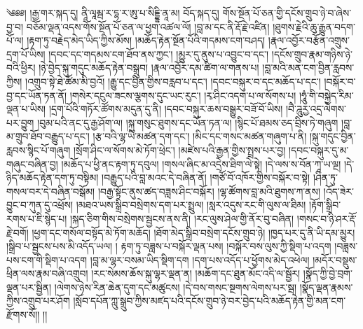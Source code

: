 \setcounter{footnote}{0} 
༄༅༅། །རྒྱ་གར་སྐད་དུ། ནཱི་ལཱམྦ་ར་དྷ་ར་ཨུ་པ་སིདྡྷི་ནཱ་མ། བོད་སྐད་དུ། གོས་སྔོན་པོ་ཅན་གྱི་དངོས་གྲུབ་ཉེ་བ་ཞེས་བྱ་བ། བཅོམ་ལྡན་འདས་གོས་སྔོན་པོ་ཅན་ལ་ཕྱག་འཚལ་ལོ། །བླ་མ་དང་ནི་རྡོ་རྗེ་འཛིན། །ཐུགས་རྗེའི་ཆུ་རྒྱུན་བདག་པོ་ལ། །རྟག་ཏུ་བརྗེད་མེད་ཡིད་ཀྱིས་མོས། །མཆོད་རྟེན་སྔོན་པོའི་གདམས་ངག་བཤད། །རྣལ་འབྱོར་བརྩོན་འགྲུས་དྲག་པོ་ཡིས། །དབང་དང་གདམས་ངག་ཐོབ་ནས་ཀྱང་། །མྱུར་དུ་ནུས་པ་འབྱུང་བ་དང་། །དངོས་གྲུབ་རྣམ་གཉིས་ཉེ་བའི་ཕྱིར། །ཉེ་བྱེད་སྐུ་གདུང་མཆོད་རྟེན་བསྒྲུབ། །རྣལ་འབྱོར་དམ་ཚིག་ལ་གནས་པ། །བླ་མའི་མན་ངག་བྱིན་རླབས་ཀྱིས། །འགྲུབ་སྟེ་ཐེ་ཚོམ་མི་བྱའོ། །རྒྱུ་དང་བྱིན་གྱིས་བརླབ་པ་དང་། །དབང་བསྐུར་བ་དང་མཆོད་པ་དང་། །བསྐོར་བ་བྱ་དང་ཡོན་ཏན་ནོ། །གསེར་དངུལ་ཟངས་ལྕགས་དུང་ཡང་རུང་། །རྭ་ཤིང་འདག་པ་ལ་སོགས་པ། །ཧཱུཾ་གི་བསྐྱེད་རིམ་ལྡན་པ་ཡིས། །དྲག་པོའི་གཏོར་ཚོགས་མདུན་དུ་ནི། །དབང་བསྐུར་ཆས་བསྒྱུར་བཟོ་བོ་ཡིས། །བཻ་ཌཱུརྱ་འདྲ་ལེགས་པར་བྱུག །བུམ་པའི་ནང་དུ་རྒྱ་ཤོག་ལ། །སྐུ་གསུང་ཐུགས་དང་ཡོན་ཏན་ལ། །སྙིང་པོ་ཐམས་ཅད་བྲིས་ཏེ་གཞུག །བླ་མ་གྲུབ་ཐོབ་བརྒྱུད་པ་དང་། །རྩ་བའི་ལྷ་ཡི་མཚན་དག་དང་། །མིང་དང་གསང་མཚན་གཞུག་པ་ནི། །སྐུ་གདུང་བྱིན་རླབས་སྙིང་པོ་གཞུག །སྲོག་ཤིང་ལ་སོགས་མེ་ཏོག་ཕྲེང་། །མཛེས་པའི་རྒྱན་གྱིས་སྤྲས་པར་བྱ། །དབང་བསྐུར་དུ་མ་གཞུང་བཞིན་བྱ། །མཆོད་པ་ཕྱི་ནང་རྟག་ཏུ་དབུལ། །གསལ་ཞིང་མ་འདྲེས་ཐིག་ལེ་སྟེ། །དེ་ལས་ས་བོན་ཀཱ་ཡ་ལྔ། །དེ་ཉིད་མཆོད་རྟེན་དག་ཏུ་བསྟིམ། །བརྒྱུད་པའི་བླ་མའང་དེ་བཞིན་ནོ། །གཙོ་བོ་འཁོར་གྱིས་བསྐོར་བ་སྟེ། །ཤིན་ཏུ་གསལ་བར་དེ་བཞིན་བསྒོམ། །བརྒྱ་སྟོང་ནུས་ཚད་བཟླས་ཤིང་བསྐོར། །ལྷ་ཚོགས་བླ་མའི་ཐུགས་ཀ་ནས། །འོད་ཟེར་བྱུང་བ་ཀུན་དུ་འཕྲོས། །མཐའ་ཡས་སྒྲིབ་བསྲེགས་དག་པར་སྤྲུལ། །སླར་འདུས་རང་གི་ལུས་ལ་ཐིམ། །རྟོག་སྒྲིབ་རགས་པ་ཇི་སྙེད་པ། །སྐད་ཅིག་གིས་བསྲེགས་སྦྱངས་ནས་ནི། །རང་ལུས་ཤེལ་གྱི་ནོར་བུ་བཞིན། །གསང་བ་ཉི་ཤར་རྡོ་རྗེ་བགོ། །ཕྱག་དང་གསོལ་བསྟོད་མེ་ཏོག་མཆོད། །ཐོག་མེད་སྒྲིབ་བསྲེག་དངོས་གྲུབ་ཉེ། །ཁྱད་པར་དུ་ནི་ཡི་དམ་མྱུར། །སྒྲིབ་པ་སྦྱངས་པས་མི་འདོད་ཡལ། །
རྟག་ཏུ་བཟླས་པ་བསྐོར་ལྡན་པས། །བསྐོར་བས་ལུས་ཀྱི་སྡིག་པ་འདག །བཟླས་པས་ངག་གི་སྡིག་པ་འདག །བླ་མ་ལྷར་བསམ་ཡིད་སྡིག་དག །དག་པས་འདོད་པ་ཕྱོགས་མེད་འཕེལ། །མདོར་བསྡུས་ཕྲིན་ལས་རྣམ་བཞི་འགྲུབ། །རང་སེམས་ཆོས་སྐུ་ལྷར་ལྡན་ན། །མཆོག་དང་ཐུན་མོང་འདི་ལ་སྦྱོར། །སྣོད་ཀྱི་བྱེ་བྲག་ལྡན་པར་སྦྱིན། །ལེགས་ཉེས་རིན་ཆེན་དུག་དང་མཚུངས། །དེ་བས་གསང་སྔགས་ལེགས་པར་སྦ། །སྣོད་ལྡན་རྣམས་ཀྱིས་འགྲུབ་པར་ཤོག །སློབ་དཔོན་ཀླུ་སྒྲུབ་ཀྱིས་མཛད་པའི་དངོས་གྲུབ་ཉེ་བར་བྱེད་པའི་མཆོད་རྟེན་གྱི་མན་ངག་རྫོགས་སོ།། །།